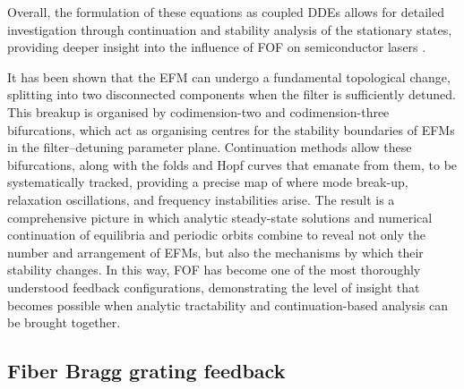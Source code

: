 Overall, the formulation of these equations as coupled DDEs allows for detailed investigation through continuation and stability analysis of the stationary states, providing deeper insight into the influence of FOF on semiconductor lasers 
\cite{erzgraber2006frequency, erzgraber2007bifurcation, erzgraber2007dynamics, fischer2000experimental, fischer2004experimental, green2006mode, 
hek2007semiconductor, erzgraber2007feedback, fischer2004filtered, yousefi2001global, yousefi2002simulations, yousefi2003nonlinear}. 
%
\par
%
It has been shown that the EFM can undergo a fundamental topological change, splitting into two disconnected components when the filter is sufficiently detuned.
This breakup is organised by codimension-two and codimension-three bifurcations, which act as organising centres for the stability boundaries of EFMs in the filter–detuning parameter plane.
Continuation methods allow these bifurcations, along with the folds and Hopf curves that emanate from them, to be systematically tracked, providing a precise map of where mode break-up, relaxation oscillations, and frequency instabilities arise. 
The result is a comprehensive picture in which analytic steady-state solutions and numerical continuation of equilibria and periodic orbits combine to reveal not only the number and arrangement of EFMs, but also the mechanisms by which their stability changes. 
In this way, FOF has become one of the most thoroughly understood feedback configurations, demonstrating the level of insight that becomes possible when analytic tractability and continuation-based analysis can be brought together.
%
%
\subsection*{Fiber Bragg grating feedback}
\label{subsec:FBG_LK}
%
